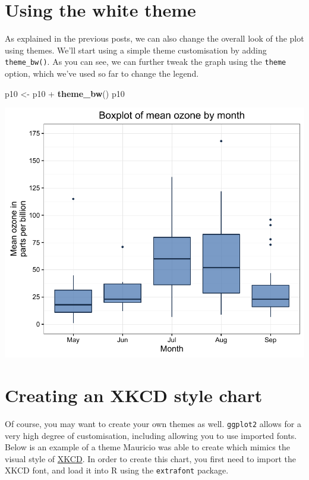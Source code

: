 \documentclass[]{article}
\newenvironment{Shaded}{\begin{snugshade}}{\end{snugshade}}
\newcommand{\KeywordTok}[1]{\textcolor[rgb]{0.13,0.29,0.53}{\textbf{{#1}}}}
\newcommand{\StringTok}[1]{\textcolor[rgb]{0.31,0.60,0.02}{{#1}}}
\newcommand{\NormalTok}[1]{{#1}}
\begin{document}
\section{Using the white theme}\label{using-the-white-theme}

As explained in the previous posts, we can also change the overall look
of the plot using themes. We'll start using a simple theme customisation
by adding \texttt{theme\_bw()}. As you can see, we can further tweak the
graph using the \texttt{theme} option, which we've used so far to change
the legend.

\begin{Shaded}
\begin{Highlighting}[]
\NormalTok{p10 <-}\StringTok{ }\NormalTok{p10 +}\StringTok{ }\KeywordTok{theme_bw}\NormalTok{()}
\NormalTok{p10}
\end{Highlighting}
\end{Shaded}

\begin{center}\includegraphics{10_Boxplots_pdf/box_10-1} \end{center}

\section{Creating an XKCD style
chart}\label{creating-an-xkcd-style-chart}

Of course, you may want to create your own themes as well.
\texttt{ggplot2} allows for a very high degree of customisation,
including allowing you to use imported fonts. Below is an example of a
theme Mauricio was able to create which mimics the visual style of
\href{http://xkcd.com/}{XKCD}. In order to create this chart, you first
need to import the XKCD font, and load it into R using the
\texttt{extrafont} package.
\end{document}
